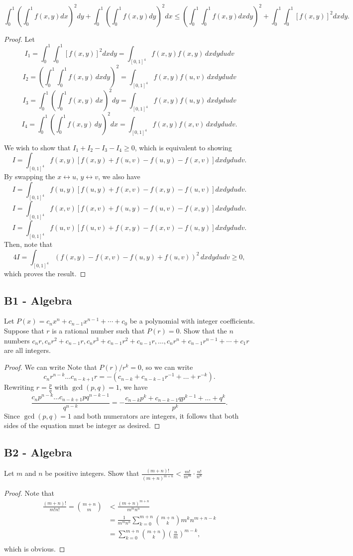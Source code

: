 \documentclass[11pt]{scrartcl}
\newcommand{\<}{\langle}
\renewcommand{\>}{\rangle}
\begin{document}
$$\int_0^1\left(\int_0^1f(x,y)dx\right)^2dy + \int_0^1\left(\int_0^1f(x,y)dy\right)^2dx\le\left(\int_0^1\int_0^1f(x,y)dxdy\right)^2 + \int_0^1\int_0^1\left[f(x,y)\right]^2dxdy.$$
\begin{proof}
Let 
$$I_1 = \int_0^1\int_0^1\left[f(x,y)\right]^2dxdy = \int_{[0, 1]^4} f(x, y) f(x, y) \,dx dy du dv$$
$$I_2 = \left ( \int_0^1\int_0^1f(x,y)\,dxdy \right)^2 = \int_{[0, 1]^4} f(x, y) f(u, v) \,dx dy du dv$$
$$I_3 =   \int_0^1 \left (\int_0^1f(x,y)\,dx\right)^2dy = \int_{[0, 1]^4} f(x, y) f(u, y) \,dx dy du dv$$
$$I_4 =   \int_0^1 \left (\int_0^1f(x,y)\,dy\right)^2dx = \int_{[0, 1]^4} f(x, y) f(x, v) \,dx dy du dv.$$

We wish to show that $I_1 + I_2 - I_3 - I_4 \ge 0$, which is equivalent to showing 
$$I = \int_{[0, 1]^4} f(x, y) \left [f(x, y) + f(u, v) - f(u, y) - f(x, v) \right]dxdydudv.$$
By swapping the $x \leftrightarrow u$, $y \leftrightarrow v$, we also have 
$$I = \int_{[0, 1]^4} f(u, y) \left [f(u, y) + f(x, v) - f(x, y) - f(u, v) \right]dxdydudv.$$
$$I = \int_{[0, 1]^4} f(x, v) \left [f(x, v) + f(u, y) - f(u, v) - f(x, y) \right]dxdydudv.$$
$$I = \int_{[0, 1]^4} f(u, v) \left [f(u, v) + f(x, y) - f(x, v) - f(u, y) \right]dxdydudv.$$
Then, note that 
$$4I =  \int_{[0, 1]^4} \left (f(x, y) - f(x, v) - f(u, y) + f(u, v) \right)^2 \,dxdydudv \ge 0,$$
which proves the result.  
\end{proof}
\pagebreak
\subsection{B1 - Algebra}
Let $P(x)=c_nx^n+c_{n-1}x^{n-1}+\cdots+c_0$ be a polynomial with integer coefficients. Suppose that $r$ is a rational number such that $P(r)=0$. Show that the $n$ numbers
$c_nr, c_nr^2+c_{n-1}r, c_nr^3+c_{n-1}r^2+c_{n-1}r, \dots, c_nr^n+c_{n-1}r^{n-1}+\cdots+c_1r$
are all integers.
\begin{proof}
We can write Note that $P(r)/r^{k} = 0$, so we can write
$$c_n r^{n-k} \dots c_{n-k+1}r = - (c_{n-k}  + c_{n-k-1}r^{-1} + \dots + r^{-k}).$$
Rewriting $r = \frac{p}{q}$ with $\gcd(p, q) = 1$, we have
$$\frac{c_n p^{n-k} \dots c_{n-k+1}pq^{n-k-1}}{q^{n-k}} = - \frac{c_{n-k}p^k  + c_{n-k-1}q p^{k-1} + \dots + q^k}{p^k}.$$
Since $\gcd(p, q) = 1$ and both numerators are integers, it follows that both sides of the equation must be integer as desired.
\end{proof}
\pagebreak
\subsection{B2 - Algebra}
Let $m$ and $n$ be positive integers. Show that
$\frac{(m+n)!}{(m+n)^{m+n}} < \frac{m!}{m^m}\cdot\frac{n!}{n^n}$
\begin{proof}
Note that
\begin{align*}
\frac{(m+n)!}{m!n!} = \binom{m+n}{m} &< \frac{(m+n)^{m+n}}{m^mn^n}  \\
&= \frac{1}{m^mn^n} \sum_{k=0}^{m+n} \binom{m+n}{k} m^k n^{m+n-k} \\
&=  \sum_{k=0}^{m+n} \binom{m+n}{k} \left( \frac{n}{m}\right)^{m-k},\\
\end{align*}
which is obvious.
\end{proof}
\pagebreak
\end{document}
